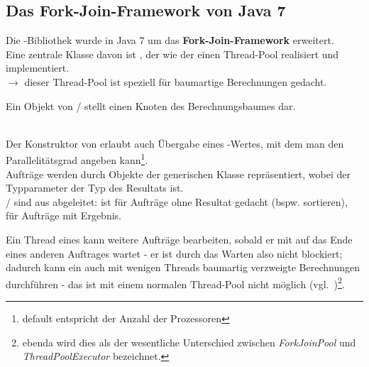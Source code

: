 \subsection{Das Fork-Join-Framework von Java 7}

Die -Bibliothek wurde in Java 7 um das \textbf{Fork-Join-Framework} erweitert.\\

\noindent
Eine zentrale Klasse davon ist , der wie der  einen Thread-Pool realisiert und  implementiert.\\

\noindent
$\rightarrow$ dieser Thread-Pool ist speziell für baumartige Berechnungen gedacht.

\begin{tcolorbox}[enlarge top by=0.5cm,enlarge bottom by=0.5cm]
    Ein Objekt von  /  stellt einen Knoten des Berechnungsbaumes dar.
\end{tcolorbox}\\

\noindent
Der Konstruktor von  erlaubt auch Übergabe eines -Wertes, mit dem man den Parallelitätsgrad angeben kann\footnote{default entspricht der Anzahl der Prozessoren}.\\

\noindent
Aufträge werden durch Objekte der generischen Klasse  repräsentiert, wobei der Typparameter der Typ des Resultats ist.\\

\noindent
{}/ sind aus  abgeleitet:  ist für Aufträge ohne Resultat gedacht (bspw. sortieren),  für Aufträge mit Ergebnis.\\

\begin{tcolorbox}
Ein Thread eines  kann weitere Aufträge bearbeiten, sobald er mit  auf das Ende eines anderen Auftrages wartet - er ist durch das Warten also nicht blockiert; dadurch kann ein  auch mit wenigen Threads baumartig verzweigte Berechnungen durchführen - das ist mit einem normalen Thread-Pool nicht möglich (vgl.~\cite[168]{Oec22})\footnote{
    ebenda wird dies als der wesentliche Unterschied zwischen \textit{ForkJoinPool} und \textit{ThreadPoolExecutor} bezeichnet.
}.\\
\end{tcolorbox}

